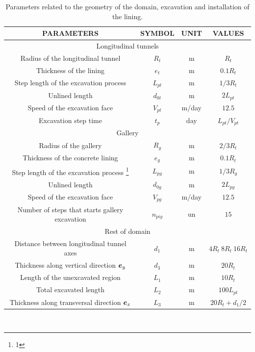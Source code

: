 \documentclass[a4paper,fleqn]{cas-sc}
\begin{document}
\begin{table}
	\caption{Parameters related to the geometry of the domain, excavation and installation of the lining.}
	\label{table1}
	\centering
	\renewcommand{\arraystretch}{1.25}
	\begin{tabular}{c c c c}
		\hline
		\multicolumn{1}{c}{PARAMETERS} &
		\multicolumn{1}{c}{SYMBOL} &
		\multicolumn{1}{c}{UNIT} &
		\multicolumn{1}{c}{VALUES} \\
		\hline
		\multicolumn{4}{c}{Longitudinal tunnels} \\
		\hline
		Radius of the longitudinal tunnel & $R_t$ & m & $R_t$ \\
		Thickness of the lining & $e_t$ & m & $0.1R_t$ \\
		Step length of the excavation process & $L_{pt}$ & m & $1/3R_t$ \\
		Unlined length & $d_{0t}$ & m & $2L_{pt}$ \\
		Speed of the excavation face & $V_{pt}$ & m/day & $12.5$ \\
		Excavation step time & $t_p$ & day & $L_{pt}/V_{pt}$ \\
		\hline
		\multicolumn{4}{c}{Gallery} \\
		\hline
		Radius of the gallery & $R_{g}$ & m & $2/3R_t$ \\
		Thickness of the concrete lining & $e_g$ & m & $0.1R_t$ \\
		Step length of the excavation process \footnote{1} & $L_{pg}$ & m & $1/3R_g$ \\
		Unlined length & $d_{0g}$ & m & $2L_{pg}$ \\
		Speed of the excavation face & $V_{pg}$ & m/day & $12.5$ \\
		Number of steps that starts gallery excavation & $n_{pig}$ & un & $15$ \\
		\hline
		\multicolumn{4}{c}{Rest of domain} \\
		\hline
		Distance between longitudinal tunnel axes & $d_1$ & m & $4R_t ~8R_t ~16R_t$ \\
		Thickness along vertical direction $\boldsymbol{e}_y$ & $d_3$ & m & $20R_t$ \\
		Length of the unexcavated region & $L_1$ & m & $10R_t$ \\
		Total excavated length & $L_2$ & m & $100L_{pt}$ \\
		Thickness along transversal direction $\boldsymbol{e}_x$ & $L_3$ & m & $20R_t + d_1/2$ \\
		\hline
	\end{tabular}
	\normalsize
	\\ 
\end{table}
\end{document}
